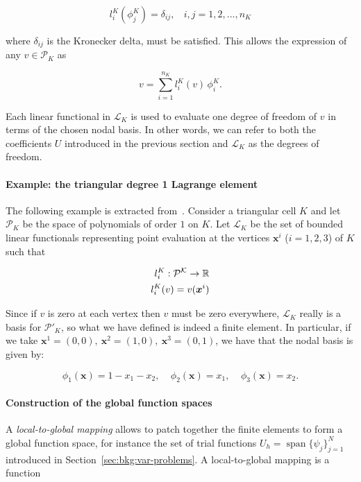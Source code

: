 \begin{equation}
l_i^K(\phi_j^K) = \delta_{ij},\ \ \ \ i,j = 1,2,...,n_K
\end{equation}

where $\delta_{ij}$ is the Kronecker delta, must be satisfied. This allows the expression of any $v \in \mathcal{P}_K$ as

\begin{equation}
v = \sum_{i=1}^{n_K} l_i^K(v) \, \phi_i^K.
\end{equation}

Each linear functional in $\mathcal{L}_K$ is used to evaluate one degree of freedom of $v$ in terms of the chosen nodal basis. In other words, we can refer to both the coefficients $U$ introduced in the previous section and $\mathcal{L}_K$ as the degrees of freedom.

\paragraph{Example: the triangular degree 1 Lagrange element}
The following example is extracted from~\cite{Fenics}. Consider a triangular cell $K$ and let $\mathcal{P}_K$ be the space of polynomials of order $1$ on $K$. Let $\mathcal{L}_K$ be the set of bounded linear functionals representing point evaluation at the vertices $\boldsymbol{x}^i$ ($i=1,2,3$) of $K$ such that

\begin{equation}
\centering
\begin{split}
l_i^K : \mathcal{P^K} \rightarrow \mathbb{R} \\
l_i^K(v) = v(\boldsymbol{x}^i)
\end{split}
\end{equation}

Since if $v$ is zero at each vertex then $v$ must be zero everywhere, $\mathcal{L}_K$ really is a basis for $\mathcal{P}'_K$, so what we have defined is indeed a finite element. In particular, if we take $\boldsymbol{x}^1 = (0, 0),\ \boldsymbol{x}^2 = (1,0),\ \boldsymbol{x}^3 = (0,1)$, we have that the nodal basis is given by:

\begin{equation}
\phi_1(\boldsymbol{x}) = 1 - x_1 - x_2,\ \ \ \ \ \phi_2(\boldsymbol{x}) = x_1,\ \ \ \ \ \phi_3(\boldsymbol{x}) = x_2.
\end{equation}

\paragraph{Construction of the global function spaces}
A {\em local-to-global mapping} allows to patch together the finite elements to form a global function space, for instance the set of trial functions $U_h = \operatorname{span}\lbrace \psi_j \rbrace_{j=1}^N$ introduced in Section~\ref{sec:bkg:var-problems}. A local-to-global mapping is a function

